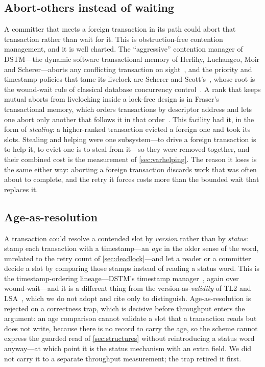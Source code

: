 \documentclass[11pt]{article}
\begin{document}
\subsection{Abort-others instead of waiting}
\label{sec:varabort}

A committer that meets a foreign transaction in its path could abort that
transaction rather than wait for it. This is obstruction-free contention
management, and it is well charted. The ``aggressive'' contention manager of
DSTM---the dynamic software transactional memory of Herlihy, Luchangco,
Moir and Scherer---aborts any conflicting transaction on
sight~\citep{herlihy2003dstm}, and the priority and
timestamp policies that tame its livelock are Scherer and
Scott's~\citep{scherer2005contention}, whose root is the wound-wait rule of
classical database concurrency control~\citep{rosenkrantz1978woundwait}. A rank
that keeps mutual aborts from livelocking inside a lock-free design is in
Fraser's transactional memory, which orders transactions by descriptor address
and lets one abort only another that follows it in that
order~\citep{fraser2004lockfreedom}. This
facility had it, in the form of \emph{stealing}: a higher-ranked transaction evicted
a foreign one and took its slots. Stealing and helping were one subsystem---to
drive a foreign transaction is to help it, to evict one is to steal from it---so
they were removed together, and their combined cost is the measurement of
\cref{sec:varhelping}. The reason it loses is the same either way: aborting a
foreign transaction discards work that was often about to complete, and the retry
it forces costs more than the bounded wait that replaces it.

\subsection{Age-as-resolution}
\label{sec:varage}

A transaction could resolve a contended slot by \emph{version} rather than by
\emph{status}: stamp each transaction with a timestamp---an \emph{age} in the
older sense of the word, unrelated to the retry count of
\cref{sec:deadlock}---and let a reader or a committer decide a slot by comparing
those stamps instead of reading a status word. This
is the timestamp-ordering lineage---DSTM's timestamp
manager~\citep{herlihy2003dstm}, again over wound-wait---and it is a different
thing from the version-as-\emph{validity} of TL2 and
LSA~\citep{dice2006tl2, riegel2006lsa}, which we do not adopt and cite only to
distinguish. Age-as-resolution is rejected on a correctness trap, which is
decisive before throughput enters the argument: an age comparison cannot validate
a slot that a transaction reads but does not write, because there is no record to
carry the age, so the scheme cannot express the guarded read of
\cref{sec:structures} without reintroducing a status word anyway---at which point
it is the status mechanism with an extra field. We did not carry it to a separate
throughput measurement; the trap retired it first.
\end{document}
